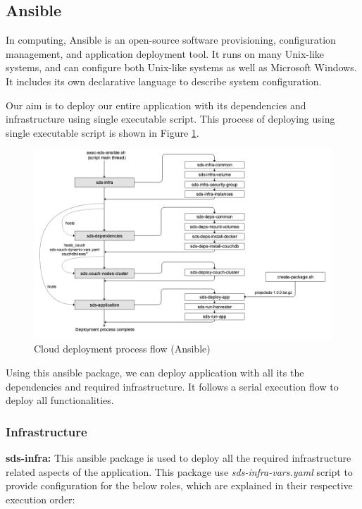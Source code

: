 \subsection{Ansible}
In computing, Ansible is an open-source software provisioning, configuration management, and application deployment tool. It runs on many Unix-like systems, and can configure both Unix-like systems as well as Microsoft Windows. It includes its own declarative language to describe system configuration.

Our aim is to deploy our entire application with its dependencies and infrastructure using single executable script. This process of deploying using single executable script is shown in Figure \ref{fig:cloudansibledeplyment}.

\begin{figure}[H]
    \centering
    \includegraphics[width=16cm,keepaspectratio=true]{images/deployment/cloud_deployment_ansible.png}
    \caption{Cloud deployment process flow (Ansible)}
    \label{fig:cloudansibledeplyment}
\end{figure}

Using this ansible package, we can deploy application with all its the dependencies and required infrastructure. It follows a serial execution flow to deploy all functionalities.

\subsubsection{Infrastructure}
\textbf{sds-infra:} This ansible package is used to deploy all the required infrastructure related aspects of the application. This package use \emph{sds-infra-vars.yaml} script to provide configuration for the below roles, which are explained in their respective execution order:

